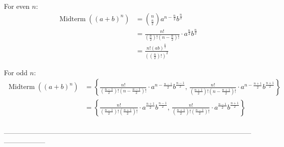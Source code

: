 \documentclass{article}
\DeclareMathOperator{\Midterm}{Midterm}
\begin{document}
\begin{itemize}
For even $n$:
\begin{align*}
	\Midterm\left((a+b)^n\right)&=\binom{n}{\frac{n}{2}}
		a^{n-\frac{n}{2}}b^{\frac{n}{2}} \\
	&=\frac{n!}{\left(\frac{n}{2}\right)!\left(n-\frac{n}{2}\right)!}
		\cdot a^{\frac{n}{2}}b^{\frac{n}{2}} \\
	&=\frac{n!(ab)^{\frac{n}{2}}}
		{\left(\left(\frac{n}{2}\right)!\right)^2}
\end{align*}

For odd $n$:
\begin{align*}
	\Midterm\left((a+b)^n\right)&=\left\lbrace
		\frac{n!}{\left(\frac{n-1}{2}\right)!\left(n-\frac{n-1}{2}
		\right)!}\cdot a^{n-\frac{n-1}{2}}b^{\frac{n-1}{2}},\,
		\frac{n!}{\left(\frac{n+1}{2}\right)!\left(n-\frac{n+1}{2}
		\right)!}\cdot a^{n-\frac{n+1}{2}}b^{\frac{n+1}{2}}
		\right\rbrace \\
	&=\left\lbrace
		\frac{n!}{\left(\frac{n-1}{2}\right)!\left(\frac{n+1}{2}
		\right)!}\cdot a^{\frac{n+1}{2}}b^{\frac{n-1}{2}},\,
		\frac{n!}{\left(\frac{n+1}{2}\right)!\left(\frac{n-1}{2}
		\right)!}\cdot a^{\frac{n-1}{2}}b^{\frac{n+1}{2}}
		\right\rbrace \\
\end{align*}

\centering
------------------------------------------------------------------------------------------------------------------------------
\flushleft


\end{itemize}
\end{document}
